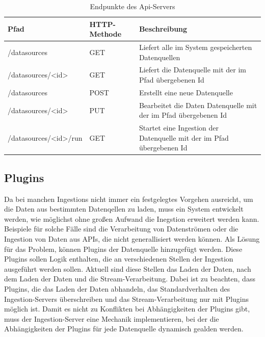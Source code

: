 \begin{table}[!ht]
    \centering
    \begin{tabular}{| l | l | p{3in} |}
        \hline
        Pfad                                        & HTTP-Methode  & Beschreibung \\
        \hline \hline
        /datasources                                & GET           & Liefert alle im System gespeicherten Datenquellen \\
        \hline
        /datasources/\textless id\textgreater       & GET           & Liefert die Datenquelle mit der im Pfad übergebenen Id \\
        \hline
        /datasources                                & POST          & Erstellt eine neue Datenquelle \\
        \hline
        /datasources/\textless id\textgreater       & PUT           & Bearbeitet die Daten Datenquelle mit der im Pfad übergebenen Id \\
        \hline
        /datasources/\textless id\textgreater/run   & GET           & Startet eine Ingestion der Datenquelle mit der im Pfad übergebenen Id \\
        \hline
    \end{tabular}
    \caption{Endpunkte des Api-Servers}
    \label{tab:enpoints}
\end{table}

\subsection{Plugins}
Da bei manchen Ingestions nicht immer ein festgelegtes Vorgehen ausreicht, um die Daten aus bestimmten Datenqellen zu laden, muss ein System entwickelt werden, wie möglichst ohne großen Aufwand die Inegstion erweitert werden kann.
Beispiele für solche Fälle sind die Verarbeitung von Datenströmen oder die Ingestion von Daten aus APIs, die nicht generallisiert werden können.
Als Lösung für das Problem, können Plugins der Datenquelle hinzugefügt werden. 
Diese Plugins sollen Logik enthalten, die an verschiedenen Stellen der Ingestion ausgeführt werden sollen.
Aktuell sind diese Stellen das Laden der Daten, nach dem Laden der Daten und die Stream-Verarbeitung.
Dabei ist zu beachten, dass Plugins, die das Laden der Daten abhandeln, das Standardverhalten des Ingestion-Servers überschreiben und das Stream-Verarbeitung nur mit Plugins möglich ist.
Damit es nicht zu Konflikten bei Abhängigkeiten der Plugins gibt, muss der Ingestion-Server eine Mechanik implementieren, bei der die Abhängigkeiten der Plugins für jede Datenquelle dynamisch gealden werden.

